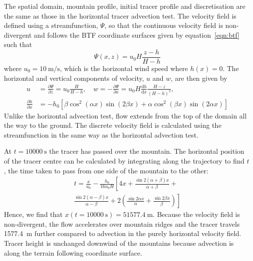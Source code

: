 \documentclass[twocol]{ametsoc}
\begin{document}
The spatial domain, mountain profile, initial tracer profile and discretisation are the same as those in the horizontal tracer advection test.  The velocity field is defined using a streamfunction, $\Psi$, so that the continuous velocity field is non-divergent and follows the BTF coordinate surfaces given by equation~\ref{eqn:btf} such that
\begin{equation}
	\Psi(x,z) = u_0 H \frac{z - h}{H - h}
\end{equation}
where $u_0 = \SI{10}{\meter\per\second}$, which is the horizontal wind speed where $h(x) = 0$.
The horizontal and vertical components of velocity, $u$ and $w$, are then given by
\begin{align}
	u &= \frac{\partial \Psi}{\partial z} = u_0 \frac{H}{H - h}, \quad w = -\frac{\partial \Psi}{\partial x} = u_0 H \frac{\mathrm{d} h}{\mathrm{d} x} \frac{H - z}{\left( H - h \right)^2}, \nonumber \\
	\frac{\partial h}{\partial x} &= - h_0 \left[ 
		\beta \cos^2 \left( \alpha x \right) \sin \left( 2 \beta x \right) +
		\alpha \cos^2 \left( \beta x \right) \sin \left( 2 \alpha x \right)
	\right]
\end{align}
Unlike the horizontal advection test, flow extends from the top of the domain all the way to the ground.  The discrete velocity field is calculated using the streamfunction in the same way as the horizontal advection test.

At $t = \SI{10000}{\second}$ the tracer has passed over the mountain.  The horizontal position of the tracer centre can be calculated by integrating along the trajectory to find $t$, the time taken to pass from one side of the mountain to the other:
\begin{multline}
t = \frac{x}{u_0} - \frac{h_0}{16 u_0 H} \left[ 4x + \frac{\sin 2 (\alpha + \beta) x}{\alpha + \beta} \right.+ \\
\left. \frac{\sin 2(\alpha - \beta) x}{\alpha - \beta} + 2 \left( \frac{\sin 2\alpha x}{\alpha} + \frac{\sin 2\beta x}{\beta} \right) \right]
\end{multline}
Hence, we find that \(x(t=\SI{10000}{\second}) = \SI{51577.4}{\meter}\).  Because the velocity field is non-divergent, the flow accelerates over mountain ridges and the tracer travels \SI{1577.4}{\meter} further compared to advection in the purely horizontal velocity field.  Tracer height is unchanged downwind of the mountains because advection is along the terrain following coordinate surface.
\end{document}
